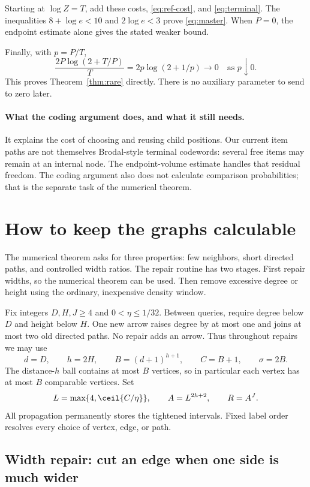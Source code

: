 Starting at \(\log Z=T\), add these costs, \eqref{eq:ref-cost}, and \eqref{eq:terminal}. The inequalities \(8+\log e<10\) and \(2\log e<3\) prove \eqref{eq:master}. When \(P=0\), the endpoint estimate alone gives the stated weaker bound.

Finally, with \(p=P/T\),
\[
\frac{2P\log(2+T/P)}T=2p\log(2+1/p)\longrightarrow0
\quad\text{as }p\downarrow0.
\]
This proves Theorem~\ref{thm:rare} directly. There is no auxiliary parameter to send to zero later.

\paragraph{What the coding argument does, and what it still needs.}
It explains the cost of choosing and reusing child positions. Our current item paths are not themselves Brodal-style terminal codewords: several free items may remain at an internal node. The endpoint-volume estimate handles that residual freedom. The coding argument also does not calculate comparison probabilities; that is the separate task of the numerical theorem.

\section{How to keep the graphs calculable}\label{sec:repairs}

The numerical theorem asks for three properties: few neighbors, short directed paths, and controlled width ratios. The repair routine has two stages. First repair widths, so the numerical theorem can be used. Then remove excessive degree or height using the ordinary, inexpensive density window.

Fix integers \(D,H,J\ge4\) and \(0<\eta\le1/32\). Between queries, require degree below \(D\) and height below \(H\). One new arrow raises degree by at most one and joins at most two old directed paths. No repair adds an arrow. Thus throughout repairs we may use
\[
d=D,\qquad h=2H,\qquad
B=(d+1)^{h+1},\qquad C=B+1,\qquad \sigma=2B.
\]
The distance-\(h\) ball contains at most \(B\) vertices, so in particular each vertex has at most \(B\) comparable vertices. Set
\begin{equation}\label{eq:parameters}
L=\max\{4,\ceil{C/\eta}\},\qquad A=L^{2h+2},\qquad R=A^J.
\end{equation}
All propagation permanently stores the tightened intervals. Fixed label order resolves every choice of vertex, edge, or path.

\subsection{Width repair: cut an edge when one side is much wider}

